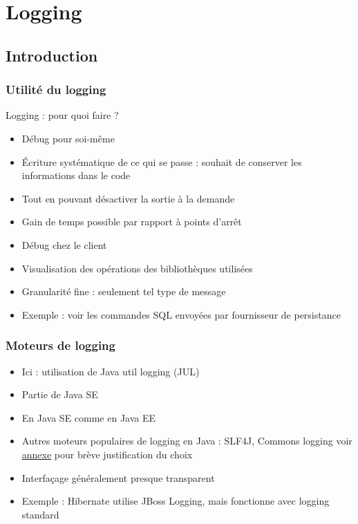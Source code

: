 \documentclass[english, french]{beamer}
\begin{document}
\section{Logging}
\subsection{Introduction}
\begin{frame}
	\frametitle{Utilité du logging}
	Logging : pour quoi faire ? \pause
	\begin{itemize}
		\item Débug pour soi-même
		\item Écriture systématique de ce qui se passe : souhait de conserver les informations dans le code
		\item Tout en pouvant désactiver la sortie à la demande
		\item Gain de temps possible par rapport à points d’arrêt
		\item Débug chez le client
		\item Visualisation des opérations des bibliothèques utilisées
		\item Granularité fine : seulement tel type de message
		\item Exemple : voir les commandes SQL envoyées par fournisseur de persistance
	\end{itemize}
\end{frame}

\begin{frame}
	\frametitle{Moteurs de logging}
	\begin{itemize}
		\item Ici : utilisation de Java util logging (JUL)
		\item Partie de Java SE
		\item En Java SE comme en Java EE
		\item Autres moteurs populaires de logging en Java : SLF4J, Commons logging {\tiny voir \hyperlink{Bataille}{annexe} pour brève justification du choix}
		\item Interfaçage {\tiny généralement presque} transparent
		\item Exemple : Hibernate utilise JBoss Logging, mais fonctionne avec logging standard
	\end{itemize}
\end{frame}
\end{document}
